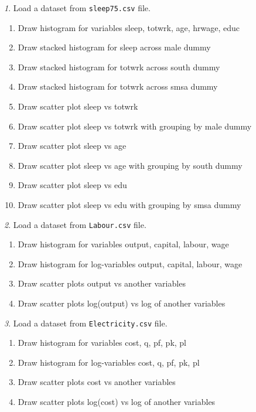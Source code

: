 \documentclass[12pt]{article}
\theoremstyle{remark}
\newtheorem{problem}{}[section]
\begin{document}
\begin{problem}
Load a dataset from \texttt{sleep75.csv} file.
\begin{enumerate}
	\item Draw histogram for variables sleep, totwrk, age, hrwage, educ
	\item Draw stacked histogram for sleep across male dummy
	\item Draw stacked histogram for totwrk across south dummy
	\item Draw stacked histogram for totwrk across smsa dummy
	\item Draw scatter plot sleep vs totwrk
	\item Draw scatter plot sleep vs totwrk with grouping by male dummy
	\item Draw scatter plot sleep vs age
	\item Draw scatter plot sleep vs age with grouping by south dummy
	\item Draw scatter plot sleep vs edu
	\item Draw scatter plot sleep vs edu with grouping by smsa dummy
\end{enumerate}
\end{problem}

\begin{problem}
Load a dataset from \texttt{Labour.csv} file.
\begin{enumerate}
	\item Draw histogram for variables output, capital, labour, wage
	\item Draw histogram for log-variables output, capital, labour, wage
	\item Draw scatter plots output vs another variables
	\item Draw scatter plots log(output) vs log of another variables
\end{enumerate}
\end{problem}

\begin{problem}
Load a dataset from \texttt{Electricity.csv} file.
\begin{enumerate}
	\item Draw histogram for variables cost, q, pf, pk, pl
	\item Draw histogram for log-variables cost, q, pf, pk, pl
	\item Draw scatter plots cost vs another variables
	\item Draw scatter plots log(cost) vs log of another variables
\end{enumerate}
\end{problem}
\end{document}
